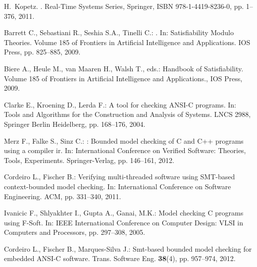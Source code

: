 \documentclass{acm_sen_article}
\begin{document}





\begin{thebibliography}{1}

H.~Kopetz.
.
\newblock Real-Time Systems Series, Springer, ISBN 978-1-4419-8236-0, pp. 1--376, 2011.

Barrett C., Sebastiani R., Seshia S.A., Tinelli C.:
.
\newblock In: Satisfiability Modulo Theories. Volume 185 of Frontiers in
  Artificial Intelligence and Applications. IOS Press, pp. 825--885, 2009.

Biere A., Heule M., van Maaren H., Walsh T., eds.:
\newblock Handbook of Satisfiability.
\newblock Volume 185 of Frontiers in Artificial Intelligence and Applications., {IOS} Press, 2009.


Clarke E., Kroening D., Lerda F.:
\newblock A tool for checking {ANSI-C} programs.
\newblock In: Tools and Algorithms for the Construction and Analysis of Systems. LNCS 2988, Springer Berlin Heidelberg,  pp. 168--176, 2004.

Merz F., Falke S., Sinz C.:
: Bounded model checking of {C} and {C++} programs using a
  compiler ir.
\newblock In: International Conference on Verified Software: Theories, Tools, Experiments. Springer-Verlag, pp. 146--161, 2012.

Cordeiro L., Fischer B.:
\newblock Verifying multi-threaded software using {SMT}-based context-bounded
  model checking.
\newblock In: International Conference on Software Engineering. ACM,  pp. 331--340, 2011.

Ivanicic F., Shlyakhter I., Gupta A., Ganai, M.K.:
\newblock Model checking {C} programs using {F-Soft}.
\newblock In: IEEE International Conference on Computer Design: VLSI in Computers and Processors, pp. 297--308, 2005.

Cordeiro L., Fischer B., Marques{-}Silva J.:
\newblock Smt-based bounded model checking for embedded {ANSI-C} software.
 Trans. Software Eng. \textbf{38}(4), pp. 957--974, 2012.


\end{thebibliography}
\end{document}
